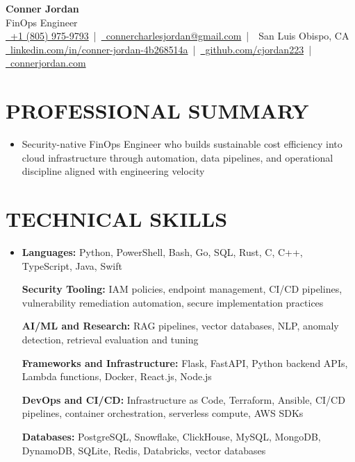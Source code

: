 \documentclass[letterpaper,10pt]{article}
\newcommand{\resumeSubHeadingListStart}{\begin{itemize}[leftmargin=0in,label={}]}
\newcommand{\resumeSubHeadingListEnd}{\end{itemize}}
\begin{document}
\begin{center}
  {\Huge \textbf{Conner Jordan}}\\[0pt]
  {\Large FinOps Engineer}\\[0pt]
  \href{tel:+18059759793}{\faPhone\ +1 (805) 975-9793} \,|\, 
  \href{mailto:connercharlesjordan@gmail.com}{\faEnvelope\ connercharlesjordan@gmail.com} \,|\, 
  \faMapMarker\ San Luis Obispo, CA \\[-2pt]
  \href{https://www.linkedin.com/in/conner-jordan-4b268514a/}{\faLinkedin\ linkedin.com/in/conner-jordan-4b268514a}
  \,|\, \href{https://github.com/cjordan223}{\faGithub\ github.com/cjordan223}
  \,|\, \href{https://connerjordan.com/}{\faGlobe\ connerjordan.com}
\end{center}

\vspace{4pt}

\section{PROFESSIONAL SUMMARY}
\vspace{8pt}
\resumeSubHeadingListStart
\item {\small
Security-native FinOps Engineer who builds sustainable cost efficiency into cloud infrastructure through automation, data pipelines, and operational discipline aligned with engineering velocity}
\resumeSubHeadingListEnd
\vspace{6pt}

\section{TECHNICAL SKILLS}
\vspace{6pt}
\resumeSubHeadingListStart
\item {\small
\textbf{Languages:} Python, PowerShell, Bash, Go, SQL, Rust, C, C++, TypeScript, Java, Swift

\vspace{3pt}
\textbf{Security Tooling:} IAM policies, endpoint management, CI/CD pipelines, vulnerability remediation automation, secure implementation practices

\vspace{3pt}
\textbf{AI/ML and Research:} RAG pipelines, vector databases, NLP, anomaly detection, retrieval evaluation and tuning

\vspace{3pt}
\textbf{Frameworks and Infrastructure:} Flask, FastAPI, Python backend APIs, Lambda functions, Docker, React.js, Node.js

\vspace{3pt}
\textbf{DevOps and CI/CD:} Infrastructure as Code, Terraform, Ansible, CI/CD pipelines, container orchestration, serverless compute, AWS SDKs

\vspace{3pt}
\textbf{Databases:} PostgreSQL, Snowflake, ClickHouse, MySQL, MongoDB, DynamoDB, SQLite, Redis, Databricks, vector databases
}
\resumeSubHeadingListEnd
\vspace{6pt}
\end{document}
